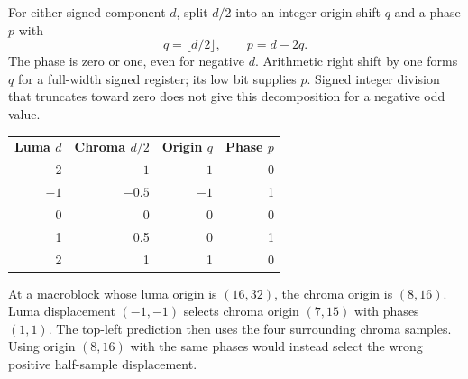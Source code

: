 For either signed component $d$, split $d/2$ into an integer origin shift $q$ and
a phase $p$ with
\[
  q=\lfloor d/2\rfloor,\qquad p=d-2q.
\]
The phase is zero or one, even for negative $d$. Arithmetic right shift by one
forms $q$ for a full-width signed register; its low bit supplies $p$. Signed
integer division that truncates toward zero does not give this decomposition
for a negative odd value.
\begin{center}
  \begin{tabular}{rrrr}
    \textbf{Luma $d$} & \textbf{Chroma $d/2$} & \textbf{Origin $q$} & \textbf{Phase $p$} \\
    $-2$              & $-1$                  & $-1$                & 0                  \\
    $-1$              & $-0.5$                & $-1$                & 1                  \\
    0                 & 0                     & 0                   & 0                  \\
    1                 & 0.5                   & 0                   & 1                  \\
    2                 & 1                     & 1                   & 0
  \end{tabular}
\end{center}
At a macroblock whose luma origin is $(16,32)$, the chroma origin is $(8,16)$.
Luma displacement $(-1,-1)$ selects chroma origin $(7,15)$ with phases $(1,1)$.
The top-left prediction then uses the four surrounding chroma samples. Using
origin $(8,16)$ with the same phases would instead select the wrong positive
half-sample displacement.


